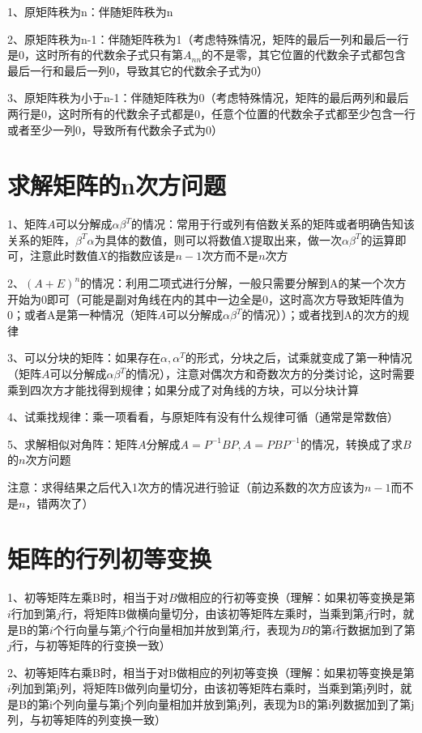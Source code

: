 1、原矩阵秩为n：伴随矩阵秩为n

2、原矩阵秩为n-1：伴随矩阵秩为1（考虑特殊情况，矩阵的最后一列和最后一行是0，这时所有的代数余子式只有第$A_{nn}$的不是零，其它位置的代数余子式都包含最后一行和最后一列0，导致其它的代数余子式为0）

3、原矩阵秩为小于n-1：伴随矩阵秩为0（考虑特殊情况，矩阵的最后两列和最后两行是0，这时所有的代数余子式都是0，任意个位置的代数余子式都至少包含一行或者至少一列0，导致所有代数余子式为0）

\section{求解矩阵的n次方问题}

1、矩阵$A$可以分解成$\alpha\beta^T$的情况：常用于行或列有倍数关系的矩阵或者明确告知该关系的矩阵，$\beta^T\alpha$为具体的数值，则可以将数值$X$提取出来，做一次$\alpha\beta^T$的运算即可，注意此时数值$X$的指数应该是$n-1$次方而不是$n$次方

2、$(A+E)^n$的情况：利用二项式进行分解，一般只需要分解到A的某一个次方开始为0即可（可能是副对角线在内的其中一边全是0，这时高次方导致矩阵值为0；或者A是第一种情况（矩阵$A$可以分解成$\alpha\beta^T$的情况））；或者找到A的次方的规律

3、可以分块的矩阵：如果存在$\alpha,\alpha^T$的形式，分块之后，试乘就变成了第一种情况（矩阵$A$可以分解成$\alpha\beta^T$的情况），注意对偶次方和奇数次方的分类讨论，这时需要乘到四次方才能找得到规律；如果分成了对角线的方块，可以分块计算

4、试乘找规律：乘一项看看，与原矩阵有没有什么规律可循（通常是常数倍）

5、求解相似对角阵：矩阵$A$分解成$A=P^{-1}BP,A=PBP^{-1}$的情况，转换成了求$B$的$n$次方问题

注意：求得结果之后代入1次方的情况进行验证（前边系数的次方应该为$n-1$而不是$n$，错两次了）

\section{矩阵的行列初等变换}

1、初等矩阵左乘B时，相当于对$B$做相应的行初等变换（理解：如果初等变换是第$i$行加到第$j$行，将矩阵B做横向量切分，由该初等矩阵左乘时，当乘到第$j$行时，就是B的第$i$个行向量与第$j$个行向量相加并放到第$j$行，表现为$B$的第$i$行数据加到了第$j$行，与初等矩阵的行变换一致）

2、初等矩阵右乘B时，相当于对B做相应的列初等变换（理解：如果初等变换是第$i$列加到第j列，将矩阵B做列向量切分，由该初等矩阵右乘时，当乘到第j列时，就是B的第i个列向量与第j个列向量相加并放到第j列，表现为B的第i列数据加到了第j列，与初等矩阵的列变换一致）

